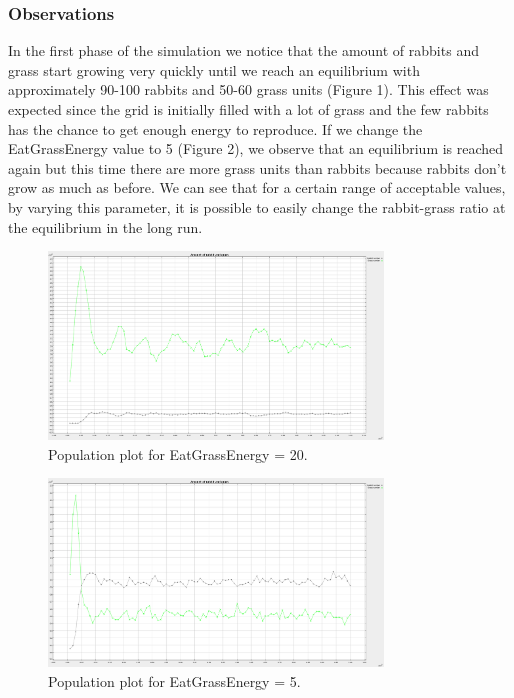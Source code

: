 \documentclass[11pt]{article}
\begin{document}
\subsubsection{Observations}
In the first phase of the simulation we notice that the amount of rabbits and grass start growing very quickly until we reach an equilibrium with approximately 90-100 rabbits and 50-60 grass units (Figure 1). This effect was expected since the grid is initially filled with a lot of grass and the few rabbits has the chance to get enough energy to reproduce. If we change the EatGrassEnergy value to 5 (Figure 2), we observe that an equilibrium is reached again but this time there are more grass units than rabbits because rabbits don't grow as much as before. We can see that for a certain range of acceptable values, by varying this parameter, it is possible to easily change the rabbit-grass ratio at the equilibrium in the long run.



\begin{figure}[h]
\centering
\includegraphics[width=1\linewidth, height=5cm]{setting1_1.png} 
\caption{Population plot for EatGrassEnergy = 20.}
\label{fig:subim1}
\end{figure}

\begin{figure}[h]
\centering
\includegraphics[width=1\linewidth, height=5cm]{setting2_2.png}
\caption{Population plot for EatGrassEnergy = 5.}
\label{fig:subim2}
\end{figure}
\end{document}
